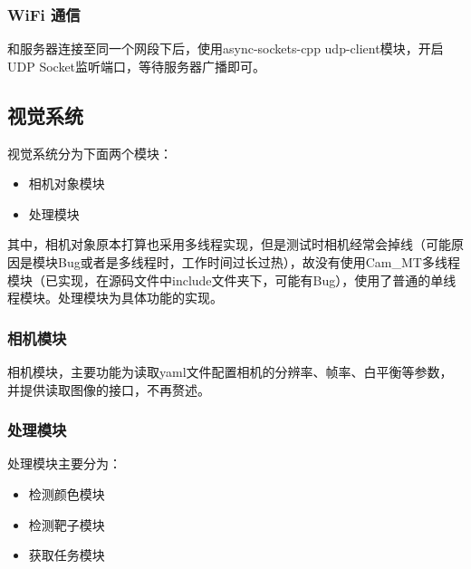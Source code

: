 \documentclass[a4paper,11pt,UTF8]{ctexart}
\begin{document}
\subsubsection{WiFi 通信}
和服务器连接至同一个网段下后，使用async-sockets-cpp udp-client模块，开启UDP Socket监听端口，等待服务器广播即可\cite{Socket}。

\subsection{视觉系统}
视觉系统分为下面两个模块：
\begin{itemize}
  \item 相机对象模块
  \item 处理模块
\end{itemize}
其中，相机对象原本打算也采用多线程实现，但是测试时相机经常会掉线（可能原因是模块Bug或者是多线程时，工作时间过长过热），故没有使用Cam\_MT多线程模块（已实现，在源码文件中include文件夹下，可能有Bug），使用了普通的单线程模块。处理模块为具体功能的实现。
\subsubsection{相机模块}
相机模块，主要功能为读取yaml文件配置相机的分辨率、帧率、白平衡等参数，并提供读取图像的接口，不再赘述。
\subsubsection{处理模块}
处理模块主要分为：
\begin{itemize}
  \item 检测颜色模块
  \item 检测靶子模块
  \item 获取任务模块
\end{itemize}

\newpage
\end{document}

